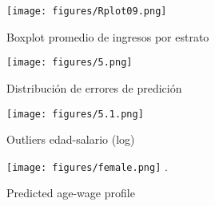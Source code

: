 \documentclass[12pt,a4paper,onecolumn]{article}
\begin{document}
\begin{figure}[H]
\caption{Boxplot promedio de ingresos por estrato} \label{fig:rplot9}
    \texttt{[image: figures/Rplot09.png]}   
 \flushleft
\end{figure}


\begin{figure}[H]
\caption{Distribuci\'on de errores de predici\'on} \label{fig:5}
    \texttt{[image: figures/5.png]}   
 \flushleft
\end{figure}


\begin{figure}[H]
\caption{Outliers edad-salario (log)} \label{fig:5.1}
    \texttt{[image: figures/5.1.png]}   
 \flushleft
\end{figure}

\begin{figure}[H]
\caption{Predicted age-wage profile} \label{fig:female}
    \texttt{[image: figures/female.png]}   
 \flushleft.
\end{figure}


\pagebreak
\appendix
\renewcommand{\theequation}{\Alph{chapter}.\arabic{equation}}

\setcounter{figure}{0}
\setcounter{table}{0}
\makeatletter 
\renewcommand{\thefigure}{A.\@arabic\c@figure}
\renewcommand{\thetable}{A.\@arabic\c@table}
\end{document}
